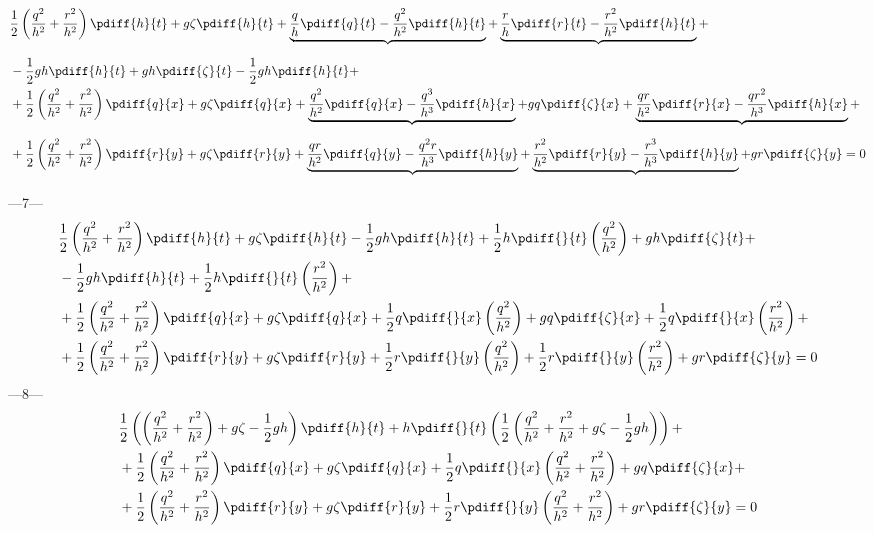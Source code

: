 \begin{align}
    & \half \left( \frac{q^2}{h^2} + \frac{r^2}{h^2} \right) \pdiff{h}{t} + g\zeta  \pdiff{h}{t}
    + \underbrace{\frac{q}{h}\pdiff{q}{t}
        - \frac{q^2}{h^2}  \pdiff{h}{t}}_{}
    + \underbrace{\frac{r}{h} \pdiff{r}{t}
        - \frac{r^2}{h^2} \pdiff{h}{t}}_{} +
    \\*
    & -\half gh \pdiff{h}{t} + gh \pdiff{\zeta}{t} -\half gh \pdiff{h}{t} +
    \\*
    &
    + \half \left( \frac{q^2}{h^2} + \frac{r^2}{h^2} \right) \pdiff{q}{x} + g\zeta \pdiff{q}{x}
    + \underbrace{\frac{q^2}{h^2}\pdiff{q}{x}
        - \frac{q^3}{h^3}  \pdiff{h}{x}}_{}
    + g q \pdiff{\zeta}{x}
    + \underbrace{\frac{qr}{h^2}  \pdiff{r}{x}
        - \frac{qr^2}{h^3}\pdiff{h}{x}}_{} +
    \\*
    &
    + \half \left( \frac{q^2}{h^2} + \frac{r^2}{h^2} \right) \pdiff{r}{y} + g\zeta \pdiff{r}{y}
    + \underbrace{\frac{qr}{h^2}\pdiff{q}{y}
        - \frac{q^2r}{h^3} \pdiff{h}{y}}_{}
    + \underbrace{\frac{r^2}{h^2} \pdiff{r}{y} - \frac{r^3}{h^3}\pdiff{h}{y}}_{}
    + g r \pdiff{\zeta}{y} = 0
\end{align}
---7---
\begin{align}
    & \half \left( \frac{q^2}{h^2} + \frac{r^2}{h^2} \right) \pdiff{h}{t} + g\zeta  \pdiff{h}{t}
    -\half gh \pdiff{h}{t}
    + \half h \pdiff{}{t}\left(\frac{q^2}{h^2} \right)
    + gh \pdiff{\zeta}{t}  +
    \\*
    &
    -\half gh \pdiff{h}{t}
    + \half h \pdiff{}{t} \left( \frac{r^2}{h^2}  \right) +
    \\*
    &
    + \half \left( \frac{q^2}{h^2} + \frac{r^2}{h^2} \right) \pdiff{q}{x} + g\zeta \pdiff{q}{x}
    + \half q \pdiff{}{x}\left( \frac{q^2}{h^2} \right)
    + g q \pdiff{\zeta}{x}
    + \half q \pdiff{}{x} \left( \frac{r^2}{h^2}  \right) +
    \\*
    &
    + \half \left( \frac{q^2}{h^2} + \frac{r^2}{h^2} \right) \pdiff{r}{y} + g\zeta \pdiff{r}{y}
    + \half r \pdiff{}{y} \left( \frac{q^2}{h^2} \right)
    + \half r \pdiff{}{y} \left( \frac{r^2}{h^2} \right)
    + g r \pdiff{\zeta}{y} = 0
\end{align}
---8---
\begin{align}
    & \half \left( \left( \frac{q^2}{h^2} + \frac{r^2}{h^2} \right) + g\zeta -\half gh \right) \pdiff{h}{t}
    + h \pdiff{}{t} \left( \half \left(\frac{q^2}{h^2}
    + \frac{r^2}{h^2} + g\zeta  - \half g h\right)
    \right) +
    \\*
    &
    + \half \left( \frac{q^2}{h^2} + \frac{r^2}{h^2} \right) \pdiff{q}{x} + g\zeta \pdiff{q}{x}
    + \half q \pdiff{}{x}\left( \frac{q^2}{h^2}  + \frac{r^2}{h^2}  \right)
    + g q \pdiff{\zeta}{x} +
    \\*
    &
    + \half \left( \frac{q^2}{h^2} + \frac{r^2}{h^2} \right) \pdiff{r}{y} + g\zeta \pdiff{r}{y}
    + \half r \pdiff{}{y} \left( \frac{q^2}{h^2} + \frac{r^2}{h^2} \right)
    + g r \pdiff{\zeta}{y} = 0
\end{align}
